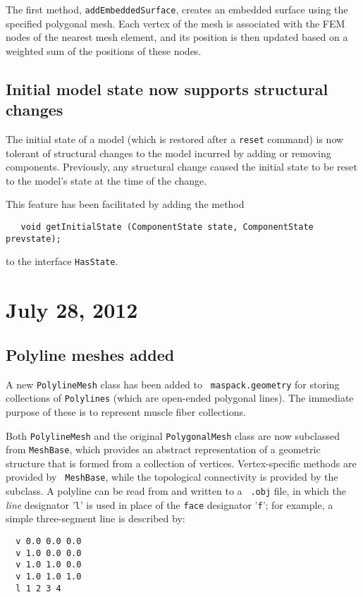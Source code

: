 \documentclass{article}
\begin{document}
The first method, {\tt addEmbeddedSurface}, creates an embedded surface
using the specified polygonal mesh. Each vertex of the mesh is
associated with the FEM nodes of the nearest mesh element, and its
position is then updated based on a weighted sum of the positions of
these nodes.

\subsection*{Initial model state now supports structural changes}

The initial state of a model (which is restored after a {\tt reset}
command) is now tolerant of structural changes to the model incurred
by adding or removing components. Previously, any structural change
caused the initial state to be reset to the model's state at the time
of the change.

This feature has been facilitated by adding the method
\begin{verbatim}
   void getInitialState (ComponentState state, ComponentState prevstate);
\end{verbatim}
to the interface {\tt HasState}.

\section*{July 28, 2012}

\subsection*{Polyline meshes added}

A new {\tt PolylineMesh} class has been added to {\tt
maspack.geometry} for storing collections of {\tt Polylines} (which
are open-ended polygonal lines). The immediate purpose of these is to
represent muscle fiber collections.

Both {\tt PolylineMesh} and the original {\tt PolygonalMesh} class are
now subclassed from {\tt MeshBase}, which provides an abstract
representation of a geometric structure that is formed from a
collection of vertices. Vertex-specific methods are provided by {\tt
MeshBase}, while the topological connectivity is provided by the
subclass.  A polyline can be read from and written to a {\tt
.obj} file, in which the {\it line} designator '{\tt l}' is used in
place of the {\tt face} designator '{\tt f}'; for example, a simple
three-segment line is described by:
\begin{lstlisting}
  v 0.0 0.0 0.0
  v 1.0 0.0 0.0
  v 1.0 1.0 0.0
  v 1.0 1.0 1.0
  l 1 2 3 4
\end{lstlisting}
\end{document}
